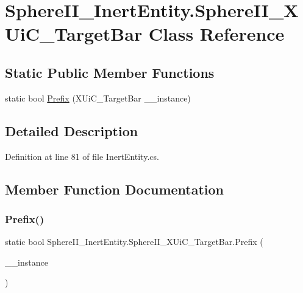 \hypertarget{class_sphere_i_i___inert_entity_1_1_sphere_i_i___x_ui_c___target_bar}{}\section{Sphere\+I\+I\+\_\+\+Inert\+Entity.\+Sphere\+I\+I\+\_\+\+X\+Ui\+C\+\_\+\+Target\+Bar Class Reference}
\label{class_sphere_i_i___inert_entity_1_1_sphere_i_i___x_ui_c___target_bar}
\subsection*{Static Public Member Functions}
\begin{DoxyCompactItemize}
\item 
static bool \mbox{\hyperlink{class_sphere_i_i___inert_entity_1_1_sphere_i_i___x_ui_c___target_bar_aca12a6ea7be28ddcf50ba81a6c581d27}{Prefix}} (X\+Ui\+C\+\_\+\+Target\+Bar \+\_\+\+\_\+instance)
\end{DoxyCompactItemize}


\subsection{Detailed Description}


Definition at line 81 of file Inert\+Entity.\+cs.



\subsection{Member Function Documentation}
\mbox{\label{class_sphere_i_i___inert_entity_1_1_sphere_i_i___x_ui_c___target_bar_aca12a6ea7be28ddcf50ba81a6c581d27}} 
\subsubsection{\texorpdfstring{Prefix()}{Prefix()}}
{\footnotesize\ttfamily static bool Sphere\+I\+I\+\_\+\+Inert\+Entity.\+Sphere\+I\+I\+\_\+\+X\+Ui\+C\+\_\+\+Target\+Bar.\+Prefix (\begin{DoxyParamCaption}\item[{X\+Ui\+C\+\_\+\+Target\+Bar}]{\+\_\+\+\_\+instance }\end{DoxyParamCaption})\hspace{0.3cm}{\ttfamily [static]}}



